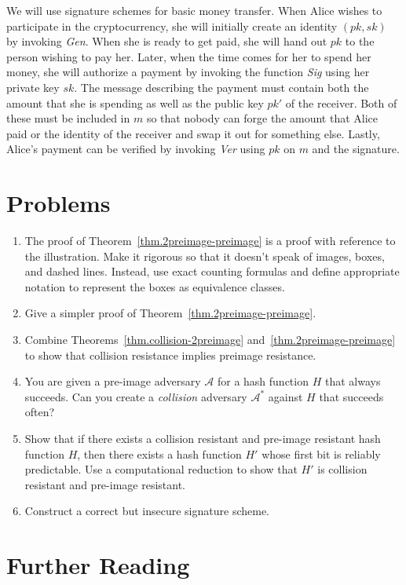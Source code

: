 We will use signature schemes for basic money transfer. When Alice wishes to participate
in the cryptocurrency, she will initially create an identity $(pk, sk)$ by invoking
\emph{Gen}. When she is ready to get paid, she will hand out $pk$ to the person wishing to
pay her. Later, when the time comes for her to spend her money, she will authorize a payment
by invoking the function \emph{Sig} using her private key $sk$. The message describing
the payment must contain both the amount that she is spending as well as the public key
$pk'$ of the receiver. Both of these must be included in $m$ so that nobody can forge
the amount that Alice paid or the identity of the receiver and swap it out for something
else. Lastly, Alice's payment can be verified by invoking \emph{Ver} using $pk$ on $m$ and the signature.

\section*{Problems}

\begin{enumerate}
  \item The proof of Theorem~\ref{thm.2preimage-preimage} is a proof with reference to the illustration. Make it rigorous so that it doesn't speak of images, boxes, and dashed lines. Instead, use exact counting formulas and define appropriate notation to represent the boxes as equivalence classes.
  \item Give a simpler proof of Theorem~\ref{thm.2preimage-preimage}.
  \item Combine Theorems~\ref{thm.collision-2preimage} and~\ref{thm.2preimage-preimage} to
        show that collision resistance implies preimage resistance.
  \item You are given a pre-image adversary $\mathcal{A}$ for a hash function $H$ that always
        succeeds. Can you create a \emph{collision} adversary $\mathcal{A}^*$ against $H$
        that succeeds often?
  \item Show that if there exists a collision resistant and pre-image resistant hash function $H$,
        then there exists a hash function $H'$ whose first bit is reliably predictable.
        Use a computational reduction to show that $H'$ is collision resistant and pre-image
        resistant.
  \item Construct a correct but insecure signature scheme.
\end{enumerate}

\section*{Further Reading}

